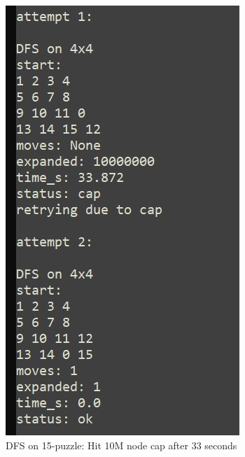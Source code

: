 \documentclass[letterpaper]{article}
\begin{document}
\begin{figure}[h]
\centering
\includegraphics[width=0.85\columnwidth]{dfs_4x4.jpg}
\caption{DFS on 15-puzzle: Hit 10M node cap after 33 seconds}
\end{figure}
\end{document}
